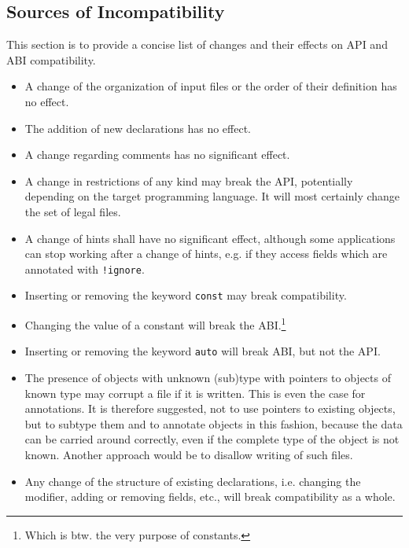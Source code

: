 \documentclass[a4paper,10pt]{article}
\begin{document}
\subsection{Sources of Incompatibility}

This section is to provide a concise list of changes and their effects on API and ABI compatibility.

\begin{itemize}
 \item A change of the organization of input files or the order of their definition has no effect.

 \item The addition of new declarations has no effect.

 \item A change regarding comments has no significant effect.

 \item A change in restrictions of any kind may break the API, potentially depending on the target programming language. It will most certainly change the set of legal files.

 \item A change of hints shall have no significant effect, although some applications can stop working after a change of hints, e.g. if they access fields which are annotated with \verb/!ignore/.

 \item Inserting or removing the keyword \texttt{const} may break compatibility.

 \item Changing the value of a constant will break the ABI.\footnote{Which is btw. the very purpose of constants.}

 \item Inserting or removing the keyword \texttt{auto} will break ABI, but not the API.

 \item The presence of objects with unknown (sub)type with pointers to objects of known type may corrupt a file if it is written. This is even the case for annotations. It is therefore suggested, not to use pointers to existing objects, but to subtype them and to annotate objects in this fashion, because the data can be carried around correctly, even if the complete type of the object is not known. Another approach would be to disallow writing of such files.

 \item Any change of the structure of existing declarations, i.e. changing the modifier, adding or removing fields, etc., will break compatibility as a whole.
\end{itemize}
\end{document}
